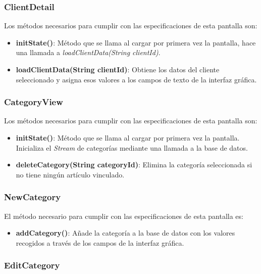 \subsubsection{ClientDetail}

Los métodos necesarios para cumplir con las especificaciones de esta pantalla son:

\begin{itemize}
	\item \textbf{initState()}: Método que se llama al cargar por primera vez la pantalla, hace una llamada a \textit{loadClientData(String clientId)}.
	\item \textbf{loadClientData(String clientId)}: Obtiene los datos del cliente seleccionado y asigna esos valores a los campos de texto de la interfaz gráfica. 
\end{itemize}

\subsubsection{CategoryView}

Los métodos necesarios para cumplir con las especificaciones de esta pantalla son:

\begin{itemize}
	\item \textbf{initState()}: Método que se llama al cargar por primera vez la pantalla. Inicializa el \textit{Stream} de categorías mediante una llamada a la base de datos. 
	\item \textbf{deleteCategory(String categoryId)}: Elimina la categoría seleccionada si no tiene ningún artículo vinculado. 
\end{itemize}

\subsubsection{NewCategory}

El método necesario para cumplir con las especificaciones de esta pantalla es:

\begin{itemize}
	\item \textbf{addCategory()}: Añade la categoría a la base de datos con los valores recogidos a través de los campos de la interfaz gráfica. 
\end{itemize}

\subsubsection{EditCategory}

